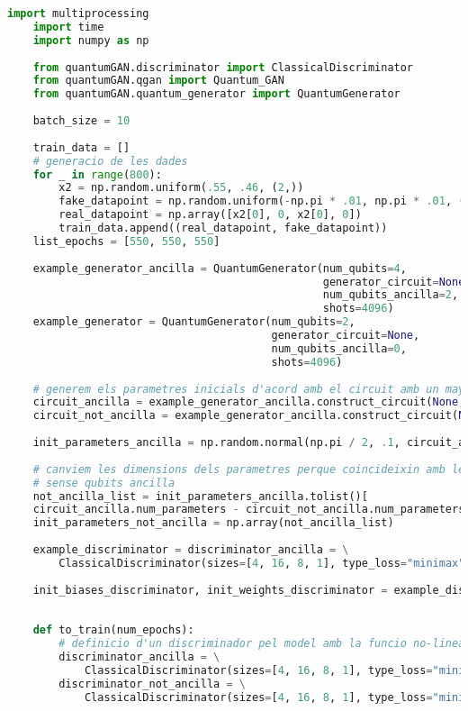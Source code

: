 \begin{lstlisting}[language=Python, caption=Executar els models amb multiprocessing]
	import multiprocessing
	import time
	import numpy as np
	
	from quantumGAN.discriminator import ClassicalDiscriminator
	from quantumGAN.qgan import Quantum_GAN
	from quantumGAN.quantum_generator import QuantumGenerator
	
	batch_size = 10
	
	train_data = []
	# generacio de les dades
	for _ in range(800):
		x2 = np.random.uniform(.55, .46, (2,))
		fake_datapoint = np.random.uniform(-np.pi * .01, np.pi * .01, (4,))
		real_datapoint = np.array([x2[0], 0, x2[0], 0])
		train_data.append((real_datapoint, fake_datapoint))
	list_epochs = [550, 550, 550]
	
	example_generator_ancilla = QuantumGenerator(num_qubits=4,
												 generator_circuit=None,
												 num_qubits_ancilla=2,
												 shots=4096)
	example_generator = QuantumGenerator(num_qubits=2,
										 generator_circuit=None,
										 num_qubits_ancilla=0,
										 shots=4096)
	
	# generem els parametres inicials d'acord amb el circuit amb un mayor nombre de parametres
	circuit_ancilla = example_generator_ancilla.construct_circuit(None, False)
	circuit_not_ancilla = example_generator_ancilla.construct_circuit(None, False)
	
	init_parameters_ancilla = np.random.normal(np.pi / 2, .1, circuit_ancilla.num_parameters)
	
	# canviem les dimensions dels parametres perque coincideixin amb les dimensions necessaries pel circuit
	# sense qubits ancilla
	not_ancilla_list = init_parameters_ancilla.tolist()[
	circuit_ancilla.num_parameters - circuit_not_ancilla.num_parameters:]
	init_parameters_not_ancilla = np.array(not_ancilla_list)
	
	example_discriminator = discriminator_ancilla = \
		ClassicalDiscriminator(sizes=[4, 16, 8, 1], type_loss="minimax")
	
	init_biases_discriminator, init_weights_discriminator = example_discriminator.init_parameters()
	
	
	def to_train(num_epochs):
		# definicio d'un discriminador pel model amb la funcio no-lineal i una altre pel model que no la te
		discriminator_ancilla = \
			ClassicalDiscriminator(sizes=[4, 16, 8, 1], type_loss="minimax")
		discriminator_not_ancilla = \
			ClassicalDiscriminator(sizes=[4, 16, 8, 1], type_loss="minimax")
	

\end{lstlisting}

